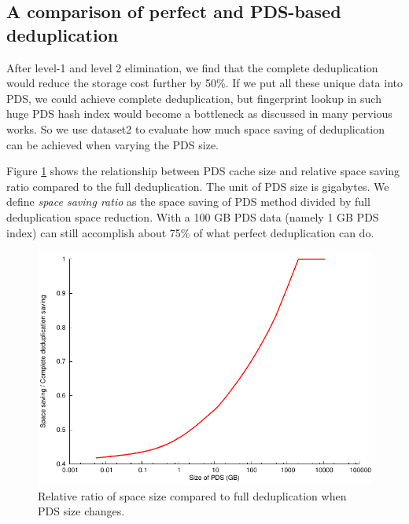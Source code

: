 \subsection{A comparison of perfect and PDS-based deduplication }
After level-1 and level 2 elimination, we find that
the complete deduplication would reduce the storage cost further by 50\%.
If we put all these unique data into PDS,
we could achieve complete deduplication,
but fingerprint lookup in such huge PDS hash index would become a bottleneck as discussed in many pervious works.
So we use dataset2 to evaluate how much space saving of
deduplication can be achieved when varying the PDS size.

Figure \ref{fig:datacdssize} shows the relationship between PDS cache size and relative space saving ratio
compared to the full deduplication.  The unit of PDS size is gigabytes.
We define \emph{space saving ratio} as the space saving of PDS method divided by
full deduplication space reduction.
With a 100 GB PDS data (namely 1 GB PDS index) can still  accomplish about 75\%
of what perfect deduplication can do.

\begin{figure}
  \centering
  \includegraphics[width=5in]{images/uniquedata-saving1.pdf}
  \caption{Relative ratio of space size compared to full deduplication when PDS size changes.}
  \label{fig:datacdssize}
\end{figure}

